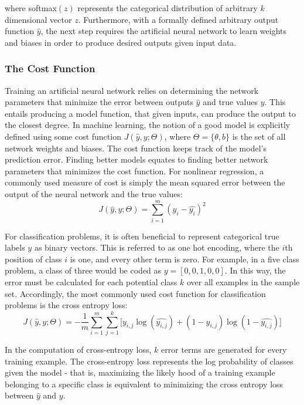 \noindent
where softmax$(z)$ represents the categorical distribution of arbitrary $k$ dimensional vector $z$. Furthermore, with a formally defined arbitrary output function $\hat{y}$, the next step requires the artificial neural network to learn weights and biases in order to produce desired outputs given input data.

\subsubsection{The Cost Function}
Training an artificial neural network relies on determining the network parameters that minimize the error between outputs $\hat{y}$ and true values $y$. This entails producing a model function, that given inputs, can produce the output to the closest degree. In machine learning, the notion of a good model is explicitly defined using some cost function $J(\hat{y},y;\Theta)$, where $\Theta = \{\theta, b\}$ is the set of all network weights and biases. The cost function keeps track of the model's prediction error. Finding better models equates to finding better network parameters that minimizes the cost function. For nonlinear regression, a commonly used measure of cost is simply the mean squared error between the output of the neural network and the true values:
\begin{equation} \label{eq:mse} 
    J(\hat{y},y;\Theta) = \sum_{i=1}^{m}(y_i - \hat{y_i})^{2}
\end{equation}

For classification problems, it is often beneficial to represent categorical true labels $y$ as binary vectors. This is referred to as one hot encoding, where the $i$th position of class $i$ is one, and every other term is zero. For example, in a five class problem, a class of three would be coded as $y = [0,0,1,0,0]$. In this way, the error must be calculated for each potential class $k$ over all examples in the sample set. Accordingly, the most commonly used cost function for classification problems is the cross entropy loss:
\begin{equation} \label{eq:softmax}
    J(\hat{y}, y; \Theta) = - \frac{1}{m}\sum_{i = 1}^{m}\sum_{j = 1}^{k} \lbrack y_{i,j} \log(\hat{y_{i,j}}) + (1 - y_{i,j})\log(1 - \hat{y_{i,j}}) \rbrack
\end{equation}

In the computation of cross-entropy loss, $k$ error terms are generated for every training example. The cross-entropy loss represents the log probability of classes given the model - that is, maximizing the likely hood of a training example belonging to a specific class is equivalent to minimizing the cross entropy loss between $\hat{y}$ and $y$. 

